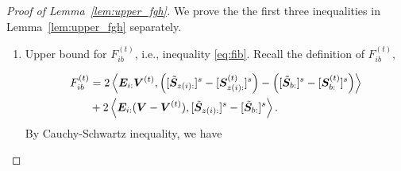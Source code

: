 \documentclass[journal]{IEEEtran}
\theoremstyle{definition}
\theoremstyle{definition}
\newcommand{\of}[1]{\left(#1\right)}
\newcommand{\ang}[1]{\left\langle#1\right\rangle}
\begin{document}
    
\begin{proof}[Proof of Lemma~\ref{lem:upper_fgh}]
We prove the the first three inequalities in Lemma~\ref{lem:upper_fgh} separately.
\begin{enumerate}[wide]
    \item Upper bound for $F_{ib}^{(t)}$, i.e., inequality \eqref{eq:fib}. Recall the definition of $F_{ib}^{(t)}$,

    \vspace{-0.5cm}
    \small
    \begin{align}
         F_{ib}^{(t)} &= 2 \ang{\mE_{i:} \mV^{(t)}, \of{ [ \tilde \mS_{z(i):} ]^s  - [\mS_{z(i):}^{(t)} ]^s  }  - \of{  [  \tilde \mS_{b:} ]^s  - [ \mS_{b:}^{(t)} ]^s  }  }  \\
         &+ 2 \ang{ \mE_{i:}(\mV - \mV^{(t)} ), [ \tilde \mS_{z(i):} ]^s - [ \tilde \mS_{b:} ]^s  }.
    \end{align}
    \normalsize
    By Cauchy-Schwartz inequality, we have 
    

\end{enumerate}
\end{proof}
\end{document}
